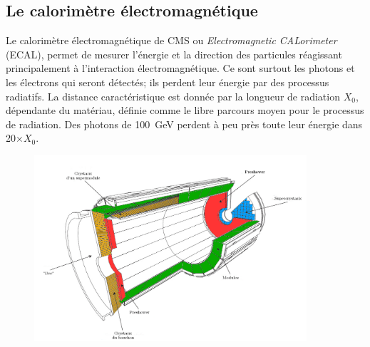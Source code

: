\subsection{Le calorimètre électromagnétique}
Le calorimètre électromagnétique de CMS ou \textit{Electromagnetic CALorimeter} (ECAL), permet de mesurer l'énergie et la direction des particules réagissant principalement à l'interaction électromagnétique. Ce sont surtout les photons et les électrons qui seront détectés; ils perdent leur énergie par des processus radiatifs. La distance caractéristique est donnée par la longueur de radiation $X_{0}$, dépendante du matériau, définie comme le libre parcours moyen pour le processus de radiation. Des photons de \SI{100}{\giga\eV} perdent à peu près toute leur énergie dans \num{20}$\times X_{0}$.
\begin{figure}[ht!]
	\centering
	\includegraphics[width=0.90\textwidth]{CMS/ECAL.png}
	\label{ECAL}
\end{figure}

